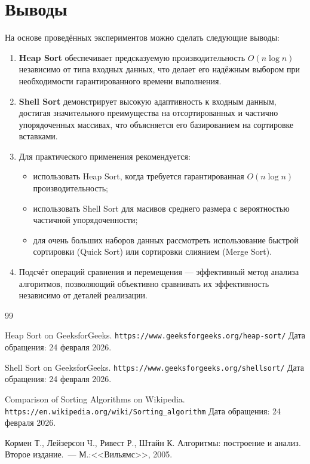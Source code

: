 \documentclass[a4paper,12pt,titlepage]{article}
\begin{document}
\newpage

\section*{Выводы}

На основе проведённых экспериментов можно сделать следующие выводы:

\begin{enumerate}
    \item \textbf{Heap Sort} обеспечивает предсказуемую производительность $O(n \log n)$ независимо от типа входных данных, что делает его надёжным выбором при необходимости гарантированного времени выполнения.
    
    \item \textbf{Shell Sort} демонстрирует высокую адаптивность к входным данным, достигая значительного преимущества на отсортированных и частично упорядоченных массивах, что объясняется его базированием на сортировке вставками.
    
    \item Для практического применения рекомендуется:
    \begin{itemize}
        \item использовать Heap Sort, когда требуется гарантированная $O(n \log n)$ производительность;
        \item использовать Shell Sort для масивов среднего размера с вероятностью частичной упорядоченности;
        \item для очень больших наборов данных рассмотреть использование быстрой сортировки (Quick Sort) или сортировки слиянием (Merge Sort).
    \end{itemize}
    
    \item Подсчёт операций сравнения и перемещения — эффективный метод анализа алгоритмов, позволяющий объективно сравнивать их эффективность независимо от деталей реализации.
\end{enumerate}

\newpage
\begin{raggedright}
\begin{thebibliography}{99}

 Heap Sort on GeeksforGeeks.
    \texttt{https://www.geeksforgeeks.org/heap-sort/}
    Дата обращения: 24 февраля 2026.

 Shell Sort on GeeksforGeeks.
    \texttt{https://www.geeksforgeeks.org/shellsort/}
    Дата обращения: 24 февраля 2026.

 Comparison of Sorting Algorithms on Wikipedia.
    \texttt{https://en.wikipedia.org/wiki/Sorting\_algorithm}
    Дата обращения: 24 февраля 2026.

 Кормен Т., Лейзерсон Ч., Ривест Р., Штайн К. Алгоритмы: построение и анализ.
    Второе издание.~--- М.:<<Вильямс>>, 2005.

\end{thebibliography}
\end{raggedright}
\end{document}

